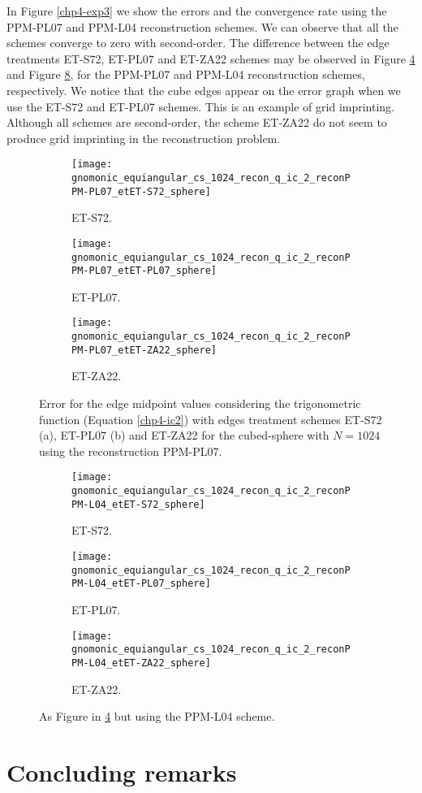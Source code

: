 In Figure \ref{chp4-exp3} we show the errors and the convergence rate using the PPM-PL07 and PPM-L04 reconstruction schemes.
We can observe that all the schemes converge to zero with second-order.
The difference between the edge treatments ET-S72, ET-PL07 and ET-ZA22 schemes
may be observed in Figure \ref{chp4-exp4} and Figure \ref{chp4-exp5}, for the  PPM-PL07 and PPM-L04 reconstruction schemes, respectively.
We notice that the cube edges appear on the error graph when we use the ET-S72 and ET-PL07 schemes. This is an example of grid imprinting.
Although all schemes are second-order, the scheme ET-ZA22 do not seem to produce grid imprinting in the reconstruction problem.
\begin{figure}[!ht]
	\centering
	\begin{subfigure}{0.3\textwidth}
		\centering
		\texttt{[image: gnomonic\_equiangular\_cs\_1024\_recon\_q\_ic\_2\_reconPPM-PL07\_etET-S72\_sphere]}
		\caption{ET-S72.\label{chp4-exp4-a}}
	\end{subfigure}
	\begin{subfigure}{0.3\textwidth}
		\centering
		\texttt{[image: gnomonic\_equiangular\_cs\_1024\_recon\_q\_ic\_2\_reconPPM-PL07\_etET-PL07\_sphere]}
		\caption{ET-PL07.\label{chp4-exp4-b}}
	\end{subfigure}
	\begin{subfigure}{0.3\textwidth}
	\centering
	\texttt{[image: gnomonic\_equiangular\_cs\_1024\_recon\_q\_ic\_2\_reconPPM-PL07\_etET-ZA22\_sphere]}
	\caption{ET-ZA22.\label{chp4-exp4-c}}
\end{subfigure}
	\caption{Error for the edge midpoint values considering the trigonometric function (Equation \eqref{chp4-ic2})
	with edges treatment schemes ET-S72 (a), ET-PL07 (b) and ET-ZA22 for the cubed-sphere with $N=1024$ using the reconstruction PPM-PL07.\label{chp4-exp4}}
\end{figure}
\begin{figure}[!ht]
	\centering
	\begin{subfigure}{0.3\textwidth}
		\centering
		\texttt{[image: gnomonic\_equiangular\_cs\_1024\_recon\_q\_ic\_2\_reconPPM-L04\_etET-S72\_sphere]}
		\caption{ET-S72.\label{chp4-exp5-a}}
	\end{subfigure}
	\begin{subfigure}{0.3\textwidth}
		\centering
		\texttt{[image: gnomonic\_equiangular\_cs\_1024\_recon\_q\_ic\_2\_reconPPM-L04\_etET-PL07\_sphere]}
		\caption{ET-PL07.\label{chp4-exp5-b}}
	\end{subfigure}
	\begin{subfigure}{0.3\textwidth}
		\centering
		\texttt{[image: gnomonic\_equiangular\_cs\_1024\_recon\_q\_ic\_2\_reconPPM-L04\_etET-ZA22\_sphere]}
		\caption{ET-ZA22.\label{chp4-exp5-c}}
	\end{subfigure}
	\caption{As Figure in \ref{chp4-exp4} but using the PPM-L04 scheme.\label{chp4-exp5}}
\end{figure}

\section{Concluding remarks}
\label{cs-conc}

